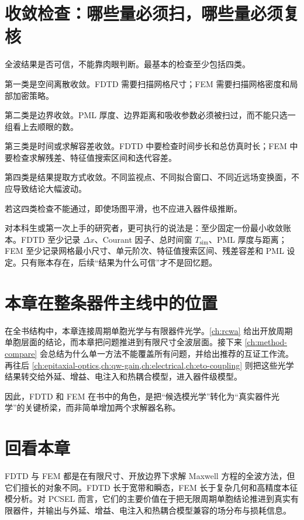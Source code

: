 \section{收敛检查：哪些量必须扫，哪些量必须复核}
全波结果是否可信，不能靠肉眼判断。最基本的检查至少包括四类。

第一类是空间离散收敛。FDTD 需要扫描网格尺寸；FEM 需要扫描网格密度和局部加密策略。

第二类是边界收敛。PML 厚度、边界距离和吸收参数必须被扫过，而不能只选一组看上去顺眼的数。

第三类是时间或求解容差收敛。FDTD 中要检查时间步长和总仿真时长；FEM 中要检查求解残差、特征值搜索区间和迭代容差。

第四类是结果提取方式收敛。不同监视点、不同拟合窗口、不同近远场变换面，不应导致结论大幅波动。

若这四类检查不能通过，即使场图平滑，也不应进入器件级推断。

对本科生或第一次上手的研究者，更可执行的说法是：至少固定一份最小收敛账本。FDTD 至少记录 $\Delta x$、Courant 因子、总时间窗 $T_{\mathrm{sim}}$、PML 厚度与距离；FEM 至少记录网格最小尺寸、单元阶次、特征值搜索区间、残差容差和 PML 设定。只有账本存在，后续“结果为什么可信”才不是回忆题。

\section{本章在整条器件主线中的位置}
在全书结构中，本章连接周期单胞光学与有限器件光学。\cref{ch:rcwa} 给出开放周期单胞层面的结论，而本章把问题推进到有限尺寸全波层面。接下来 \cref{ch:method-compare} 会总结为什么单一方法不能覆盖所有问题，并给出推荐的互证工作流。再往后 \cref{ch:epitaxial-optics,ch:qw-gain,ch:electrical,ch:eto-coupling} 则把这些光学结果转交给外延、增益、电注入和热耦合模型，进入器件级模型。

因此，FDTD 和 FEM 在书中的角色，是把“候选模光学”转化为“真实器件光学”的关键桥梁，而非简单增加两个求解器名称。

\section*{回看本章}
FDTD 与 FEM 都是在有限尺寸、开放边界下求解 Maxwell 方程的全波方法，但它们擅长的对象不同。FDTD 长于宽带和瞬态，FEM 长于复杂几何和高精度本征模分析。对 PCSEL 而言，它们的主要价值在于把无限周期单胞结论推进到真实有限器件，并输出与外延、增益、电注入和热耦合模型兼容的场分布与损耗信息。


